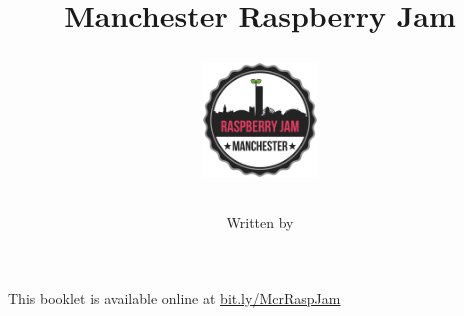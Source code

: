 \ifprint
	\title{Manchester Raspberry Jam \\ \workshopTitle}
	\author{}
\else
	\title{
		\begin{center}
			\includegraphics[width=30mm]{McrRaspJam/common/logo-512}
		\end{center}
		\vspace{12pt}
		\workshopTitle
	}
	\author{
		Written by \workshopAuthor
	}
\fi

\date{\vspace{-16pt}}
\maketitle


\ifprint
	\begin{mdframed}[rightline=false, leftline=false]
		\scriptsize
		This booklet is available online at \mbox{\href{https://drive.google.com/open?id=0B_1SFjX_5JrmfnhpX0pPRXl6bmJNal8zdUxMeWZOdjJyZVdzU3V6UnBGdlVIMENtbFFkbVk}{bit.ly/McrRaspJam}}
		\normalsize
	\end{mdframed}
\fi
